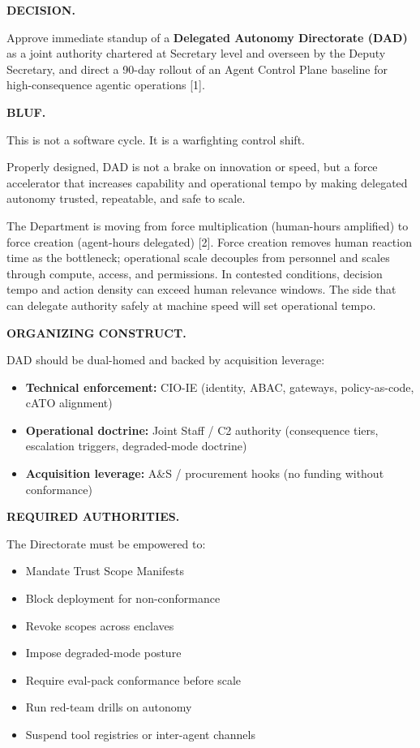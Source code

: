 \documentclass[11pt]{article}
\begin{document}
\MemoRenderHeader

\textbf{DECISION.}

Approve immediate standup of a \textbf{Delegated Autonomy Directorate
(DAD)} as a joint authority chartered at Secretary level and overseen by
the Deputy Secretary, and direct a 90-day rollout of an Agent Control
Plane baseline for high-consequence agentic operations {[}1{]}.

\textbf{BLUF.}

This is not a software cycle. It is a warfighting control shift.

Properly designed, DAD is not a brake on innovation or speed, but a
force accelerator that increases capability and operational tempo by
making delegated autonomy trusted, repeatable, and safe to scale.

The Department is moving from force multiplication (human-hours
amplified) to force creation (agent-hours delegated) {[}2{]}. Force
creation removes human reaction time as the bottleneck; operational
scale decouples from personnel and scales through compute, access, and
permissions. In contested conditions, decision tempo and action density
can exceed human relevance windows. The side that can delegate authority
safely at machine speed will set operational tempo.

\textbf{ORGANIZING CONSTRUCT.}

DAD should be dual-homed and backed by acquisition leverage:

\begin{itemize}
\tightlist
\item
  \textbf{Technical enforcement:} CIO-IE (identity, ABAC, gateways,
  policy-as-code, cATO alignment)
\item
  \textbf{Operational doctrine:} Joint Staff / C2 authority (consequence
  tiers, escalation triggers, degraded-mode doctrine)
\item
  \textbf{Acquisition leverage:} A\&S / procurement hooks (no funding
  without conformance)
\end{itemize}

\textbf{REQUIRED AUTHORITIES.}

The Directorate must be empowered to:

\begin{itemize}
\tightlist
\item
  Mandate Trust Scope Manifests
\item
  Block deployment for non-conformance
\item
  Revoke scopes across enclaves
\item
  Impose degraded-mode posture
\item
  Require eval-pack conformance before scale
\item
  Run red-team drills on autonomy
\item
  Suspend tool registries or inter-agent channels
\end{itemize}
\end{document}
